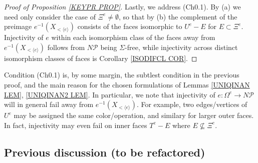 \documentclass[a4paper,10pt
,draft
]{article}%
\renewcommand{\1}{\eta}%
\begin{document}
\begin{proof}[Proof of Proposition \ref{KEYPR PROP}]
Lastly, we address (Ch0.1). By (a) we need only consider the case of $\Xi^e \neq \emptyset$,
so that by (b)
the complement of
the preimage
$e^{-1}(X_{<\langle e\rangle})$
consists of the faces isomorphic to
$U^e-E$ for $E \subset \Xi^e$.
Injectivity of $e$ within each isomorphism class of the faces away from %
$e^{-1}(X_{<\langle e\rangle})$
follows from $N \mathcal{P}$ being $\Sigma$-free,
while injectivity across distinct isomorphism classes of faces is
Corollary \ref{ISODIFCL COR}.
\end{proof}




\begin{remark}
	Condition (Ch0.1) is, by some margin, the subtlest condition in the previous proof, and the main reason for the chosen formulations of 
	Lemmas \ref{UNIQINAN LEM}, \ref{UNIQINAN2 LEM}.
	In particular, we note that injectivity of 
	$e \colon \Omega^e \to N \mathcal{P}$ will in general fail away from 
	$e^{-1}(X_{< \langle e \rangle})$.
	For example, two edges/vertices of $U^e$
	may be assigned the same color/operation, and similary for larger outer faces. In fact, injectivity may even fail on inner faces
	$T^e-E$ where $E \not \subseteq \Xi^e$.
\end{remark}






\subsection{Previous discussion (to be refactored)}
\end{document}

